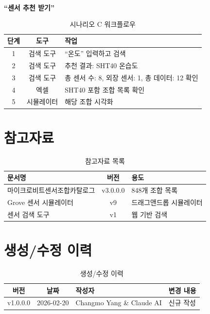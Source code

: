 \documentclass[11pt,a4paper]{article}
\begin{document}
\textbf{``센서 추천 받기''}

\begin{table}[H]
\centering
\begin{tabular}{|c|c|l|}
\hline
\rowcolor{tableheader}
\textbf{단계} & \textbf{도구} & \textbf{작업} \\
\hline
1 & 검색 도구 & ``온도'' 입력하고 검색 \\
\hline
2 & 검색 도구 & 추천 결과: SHT40 온습도 \\
\hline
3 & 검색 도구 & 총 센서 수: 8, 외장 센서: 1, 총 데이터: 12 확인 \\
\hline
4 & 엑셀 & SHT40 포함 조합 목록 확인 \\
\hline
5 & 시뮬레이터 & 해당 조합 시각화 \\
\hline
\end{tabular}
\caption{시나리오 C 워크플로우}
\end{table}

\section*{참고자료}

\begin{table}[H]
\centering
\begin{tabular}{|l|c|l|}
\hline
\rowcolor{tableheader}
\textbf{문서명} & \textbf{버전} & \textbf{용도} \\
\hline
마이크로비트센서조합카탈로그 & v3.0.0.0 & 848개 조합 목록 \\
\hline
Grove 센서 시뮬레이터 & v9 & 드래그앤드롭 시뮬레이터 \\
\hline
센서 검색 도구 & v1 & 웹 기반 검색 \\
\hline
\end{tabular}
\caption{참고자료 목록}
\end{table}

\section*{생성/수정 이력}

\begin{table}[H]
\centering
\begin{tabular}{|c|c|l|l|}
\hline
\rowcolor{tableheader}
\textbf{버전} & \textbf{날짜} & \textbf{작성자} & \textbf{변경 내용} \\
\hline
v1.0.0.0 & 2026-02-20 & Changmo Yang \& Claude AI & 신규 작성 \\
\hline
\end{tabular}
\caption{생성/수정 이력}
\end{table}
\end{document}
